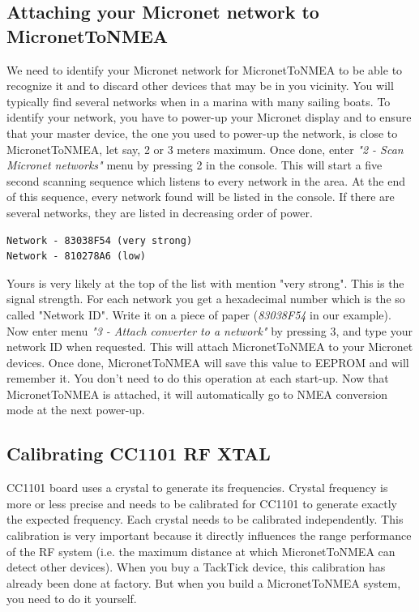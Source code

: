 \documentclass{report}
\begin{document}
\subsection{Attaching your Micronet network to MicronetToNMEA}

We need to identify your Micronet network for MicronetToNMEA to be able to recognize it and to discard other devices that may be in you vicinity. You will typically find several networks when in a marina with many sailing boats.
To identify your network, you have to power-up your Micronet display and to ensure that your master device, the one you used to power-up the network, is close to MicronetToNMEA, let say, 2 or 3 meters maximum. Once done, enter \emph{"2 - Scan Micronet networks"} menu by pressing 2 in the console. This will start a five second scanning sequence which listens to every network in the area. At the end of this sequence, every network found will be listed in the console. If there are several networks, they are listed in decreasing order of power.

\begin{verbatim}
Network - 83038F54 (very strong)
Network - 810278A6 (low)
\end{verbatim}

Yours is very likely at the top of the list with mention "very strong". This is the signal strength. For each network you get a hexadecimal number which is the so called "Network ID". Write it on a piece of paper (\emph{83038F54} in our example).
Now enter menu \emph{"3 - Attach converter to a network"} by pressing 3, and type your network ID when requested. This will attach MicronetToNMEA to your Micronet devices.
Once done, MicronetToNMEA will save this value to EEPROM and will remember it. You don't need to do this operation at each start-up. Now that MicronetToNMEA is attached, it will automatically go to NMEA conversion mode at the next power-up.

\subsection{Calibrating CC1101 RF XTAL}

CC1101 board uses a crystal to generate its frequencies. Crystal frequency is more or less precise and needs to be calibrated for CC1101 to generate exactly the expected frequency. Each crystal needs to be calibrated independently. This calibration is very important because it directly influences the range performance of the RF system (i.e. the maximum distance at which MicronetToNMEA can detect other devices). When you buy a TackTick device, this calibration has already been done at factory. But when you build a MicronetToNMEA system, you need to do it yourself.
\end{document}

